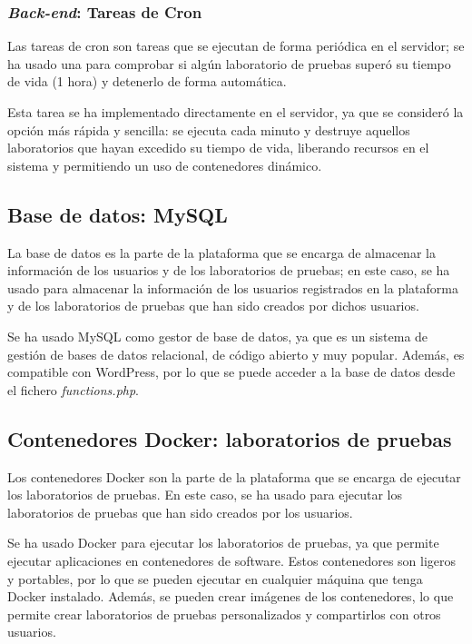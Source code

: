             \subsubsection{\textit{Back-end}: Tareas de Cron}

                Las tareas de cron son tareas que se ejecutan de forma periódica en el servidor; se ha usado una para comprobar si algún laboratorio de pruebas superó su tiempo de vida (1 hora) y detenerlo de forma automática.
                
                Esta tarea se ha implementado directamente en el servidor, ya que se consideró la opción más rápida y sencilla: se ejecuta cada minuto y destruye aquellos laboratorios que hayan excedido su tiempo de vida, liberando recursos en el sistema y permitiendo un uso de contenedores dinámico.

        \subsection{Base de datos: MySQL}

            La base de datos es la parte de la plataforma que se encarga de almacenar la información de los usuarios y de los laboratorios de pruebas; en este caso, se ha usado para almacenar la información de los usuarios registrados en la plataforma y de los laboratorios de pruebas que han sido creados por dichos usuarios.
            
            Se ha usado MySQL como gestor de base de datos, ya que es un sistema de gestión de bases de datos relacional, de código abierto y muy popular. Además, es compatible con WordPress, por lo que se puede acceder a la base de datos desde el fichero \textit{functions.php}.
        
        \subsection{Contenedores Docker: laboratorios de pruebas}

            Los contenedores Docker son la parte de la plataforma que se encarga de ejecutar los laboratorios de pruebas. En este caso, se ha usado para ejecutar los laboratorios de pruebas que han sido creados por los usuarios.
            
            Se ha usado Docker para ejecutar los laboratorios de pruebas, ya que permite ejecutar aplicaciones en contenedores de software. Estos contenedores son ligeros y portables, por lo que se pueden ejecutar en cualquier máquina que tenga Docker instalado. Además, se pueden crear imágenes de los contenedores, lo que permite crear laboratorios de pruebas personalizados y compartirlos con otros usuarios.

